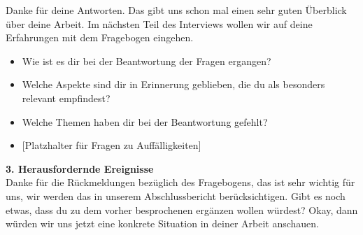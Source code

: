 \documentclass[12pt, a4paper]{article}
\begin{document}
\begin{tcolorbox}[
  breakable,
  colback=gray!10,
  colframe=black,
  arc=10pt,          %
  boxrule=0.5pt,
  left=6pt, right=6pt, top=6pt, bottom=6pt
]
Danke für deine Antworten. Das gibt uns schon mal einen sehr guten Überblick über deine
Arbeit. Im nächsten Teil des Interviews wollen wir auf deine Erfahrungen mit dem
Fragebogen eingehen.
\begin{itemize}
    \item Wie ist es dir bei der Beantwortung der Fragen ergangen?
    \item Welche Aspekte sind dir in Erinnerung geblieben, die du als besonders relevant
    empfindest?
    \item Welche Themen haben dir bei der Beantwortung gefehlt?
    \item $[$Platzhalter für Fragen zu Auffälligkeiten$]$ 
\end{itemize}

\textbf{3. Herausfordernde Ereignisse} \\

Danke für die Rückmeldungen bezüglich des Fragebogens, das ist sehr wichtig für uns, wir
werden das in unserem Abschlussbericht berücksichtigen. Gibt es noch etwas, dass du zu
dem vorher besprochenen ergänzen wollen würdest? Okay, dann würden wir uns jetzt eine
konkrete Situation in deiner Arbeit anschauen.


\end{tcolorbox}
\end{document}
